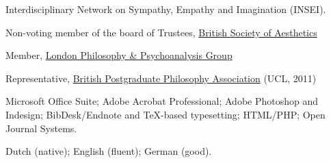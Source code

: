 \documentclass[12pt]{article}
\begin{document}
\bigskip 


\ind Interdisciplinary Network on Sympathy, Empathy and Imagination (INSEI). 

\ind Non-voting member of the board of Trustees, \href{http://www.british-aesthetics.org.uk}{British Society of Aesthetics}

\ind Member, \href{http://www.philosophy-psychoanalysis.org.uk}{London Philosophy \& Psychoanalysis Group}

\ind Representative, \href{http://www.bppa-online.org}{British Postgraduate Philosophy Association} (UCL, 2011)

\bigskip

\medskip

\ind Microsoft Office Suite; Adobe Acrobat Professional; Adobe Photoshop and Indesign; BibDesk/Endnote and TeX-based typesetting; HTML/PHP; Open Journal Systems.

\bigskip 

\medskip

\ind Dutch (native); English (fluent); German (good).

\rfoot{\footnotesize{\today}}
\end{document}
